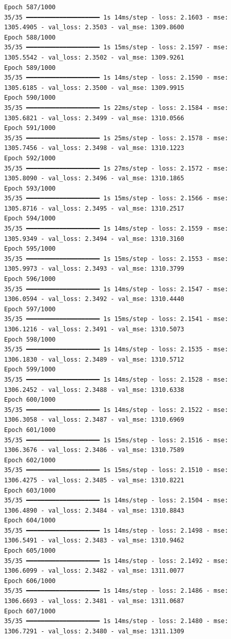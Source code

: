\documentclass[
  letterpaper,
  DIV=11,
  numbers=noendperiod]{scrreprt}
\begin{document}
\begin{verbatim}
Epoch 587/1000
35/35 ━━━━━━━━━━━━━━━━━━━━ 1s 14ms/step - loss: 2.1603 - mse: 1305.4905 - val_loss: 2.3503 - val_mse: 1309.8600
Epoch 588/1000
35/35 ━━━━━━━━━━━━━━━━━━━━ 1s 15ms/step - loss: 2.1597 - mse: 1305.5542 - val_loss: 2.3502 - val_mse: 1309.9261
Epoch 589/1000
35/35 ━━━━━━━━━━━━━━━━━━━━ 1s 14ms/step - loss: 2.1590 - mse: 1305.6185 - val_loss: 2.3500 - val_mse: 1309.9915
Epoch 590/1000
35/35 ━━━━━━━━━━━━━━━━━━━━ 1s 22ms/step - loss: 2.1584 - mse: 1305.6821 - val_loss: 2.3499 - val_mse: 1310.0566
Epoch 591/1000
35/35 ━━━━━━━━━━━━━━━━━━━━ 1s 25ms/step - loss: 2.1578 - mse: 1305.7456 - val_loss: 2.3498 - val_mse: 1310.1223
Epoch 592/1000
35/35 ━━━━━━━━━━━━━━━━━━━━ 1s 27ms/step - loss: 2.1572 - mse: 1305.8090 - val_loss: 2.3496 - val_mse: 1310.1865
Epoch 593/1000
35/35 ━━━━━━━━━━━━━━━━━━━━ 1s 15ms/step - loss: 2.1566 - mse: 1305.8716 - val_loss: 2.3495 - val_mse: 1310.2517
Epoch 594/1000
35/35 ━━━━━━━━━━━━━━━━━━━━ 1s 14ms/step - loss: 2.1559 - mse: 1305.9349 - val_loss: 2.3494 - val_mse: 1310.3160
Epoch 595/1000
35/35 ━━━━━━━━━━━━━━━━━━━━ 1s 15ms/step - loss: 2.1553 - mse: 1305.9973 - val_loss: 2.3493 - val_mse: 1310.3799
Epoch 596/1000
35/35 ━━━━━━━━━━━━━━━━━━━━ 1s 14ms/step - loss: 2.1547 - mse: 1306.0594 - val_loss: 2.3492 - val_mse: 1310.4440
Epoch 597/1000
35/35 ━━━━━━━━━━━━━━━━━━━━ 1s 15ms/step - loss: 2.1541 - mse: 1306.1216 - val_loss: 2.3491 - val_mse: 1310.5073
Epoch 598/1000
35/35 ━━━━━━━━━━━━━━━━━━━━ 1s 14ms/step - loss: 2.1535 - mse: 1306.1830 - val_loss: 2.3489 - val_mse: 1310.5712
Epoch 599/1000
35/35 ━━━━━━━━━━━━━━━━━━━━ 1s 14ms/step - loss: 2.1528 - mse: 1306.2452 - val_loss: 2.3488 - val_mse: 1310.6338
Epoch 600/1000
35/35 ━━━━━━━━━━━━━━━━━━━━ 1s 14ms/step - loss: 2.1522 - mse: 1306.3058 - val_loss: 2.3487 - val_mse: 1310.6969
Epoch 601/1000
35/35 ━━━━━━━━━━━━━━━━━━━━ 1s 15ms/step - loss: 2.1516 - mse: 1306.3676 - val_loss: 2.3486 - val_mse: 1310.7589
Epoch 602/1000
35/35 ━━━━━━━━━━━━━━━━━━━━ 1s 15ms/step - loss: 2.1510 - mse: 1306.4275 - val_loss: 2.3485 - val_mse: 1310.8221
Epoch 603/1000
35/35 ━━━━━━━━━━━━━━━━━━━━ 1s 14ms/step - loss: 2.1504 - mse: 1306.4890 - val_loss: 2.3484 - val_mse: 1310.8843
Epoch 604/1000
35/35 ━━━━━━━━━━━━━━━━━━━━ 1s 14ms/step - loss: 2.1498 - mse: 1306.5491 - val_loss: 2.3483 - val_mse: 1310.9462
Epoch 605/1000
35/35 ━━━━━━━━━━━━━━━━━━━━ 1s 14ms/step - loss: 2.1492 - mse: 1306.6099 - val_loss: 2.3482 - val_mse: 1311.0077
Epoch 606/1000
35/35 ━━━━━━━━━━━━━━━━━━━━ 1s 14ms/step - loss: 2.1486 - mse: 1306.6693 - val_loss: 2.3481 - val_mse: 1311.0687
Epoch 607/1000
35/35 ━━━━━━━━━━━━━━━━━━━━ 1s 14ms/step - loss: 2.1480 - mse: 1306.7291 - val_loss: 2.3480 - val_mse: 1311.1309

\end{verbatim}
\end{document}
